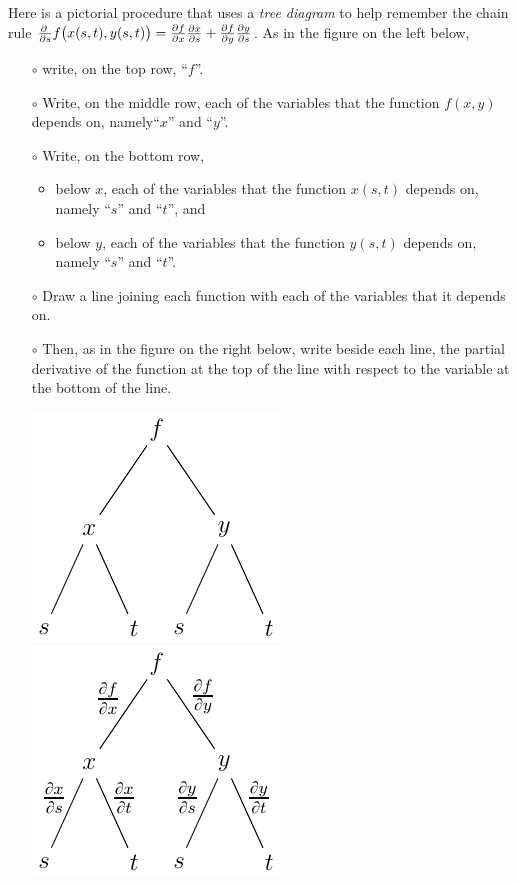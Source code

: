 Here is a pictorial procedure that uses a \emph{tree diagram} to help remember 
the chain rule
$
\pdiff{}{s}f\big(x(s,t),y(s,t)\big)=
  \pdiff{f}{x}
  \pdiff{x}{s}
  +\pdiff{f}{y}
  \pdiff{y}{s}
$. 
As in the figure on the left below,
\begin{itemize}\itemindent-15pt \itemsep1pt \parskip0pt 
\item[$\circ$]
write, on the top row, ``$f$''.
\item[$\circ$]
Write, on the middle row, each of the variables that the function $f(x,y)$ 
depends on, namely``$x$'' and ``$y$''.
\item[$\circ$]
Write, on the bottom row, 
   \begin{itemize}\itemsep1pt \parskip0pt 
       \item below $x$, each of the variables that the function $x(s,t)$ 
                   depends on, namely ``$s$'' and ``$t$'', and 
       \item below $y$, each of the variables that the function $y(s,t)$ 
                   depends on, namely ``$s$'' and ``$t$''. 
    \end{itemize}
\item[$\circ$]
Draw a line joining each function with each of the variables that it depends 
on.
\item[$\circ$]
Then, as in the figure on the right below, write beside each line, the partial
derivative of the function at the top of the line with respect to the variable at the bottom of the line.
\begin{efig}
\begin{center}
   \includegraphics{decTreeA.pdf}\qquad\qquad
   \includegraphics{decTreeB.pdf}

\end{center}
\end{efig}
\end{itemize}
